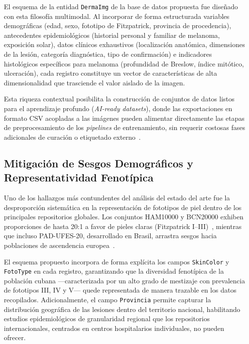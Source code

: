 El esquema de la entidad \texttt{DermaImg} de la base de datos propuesta fue diseñado con esta filosofía multimodal. Al incorporar de forma estructurada variables demográficas (edad, sexo, fototipo de Fitzpatrick, provincia de procedencia), antecedentes epidemiológicos (historial personal y familiar de melanoma, exposición solar), datos clínicos exhaustivos (localización anatómica, dimensiones de la lesión, categoría diagnóstica, tipo de confirmación) e indicadores histológicos específicos para melanoma (profundidad de Breslow, índice mitótico, ulceración), cada registro constituye un vector de características de alta dimensionalidad que trasciende el valor aislado de la imagen.

Esta riqueza contextual posibilita la construcción de conjuntos de datos listos para el aprendizaje profundo (\textit{AI-ready datasets}), donde las exportaciones en formato CSV acopladas a las imágenes pueden alimentar directamente las etapas de preprocesamiento de los \textit{pipelines} de entrenamiento, sin requerir costosas fases adicionales de curación o etiquetado externo~\cite{datavlab_annotation,medrxiv_preannotation}.

\subsection{Mitigación de Sesgos Demográficos y Representatividad Fenotípica}

Uno de los hallazgos más contundentes del análisis del estado del arte fue la desproporción sistemática en la representación de fototipos de piel dentro de los principales repositorios globales. Los conjuntos HAM10000 y BCN20000 exhiben proporciones de hasta 20:1 a favor de pieles claras (Fitzpatrick I--III)~\cite{iccs_bias_derm,pmc_ham10000,arxiv_bcn20000}, mientras que incluso PAD-UFES-20, desarrollado en Brasil, arrastra sesgos hacia poblaciones de ascendencia europea~\cite{pmc_padufes}.

El esquema propuesto incorpora de forma explícita los campos \texttt{SkinColor} y \texttt{FotoType} en cada registro, garantizando que la diversidad fenotípica de la población cubana ---caracterizada por un alto grado de mestizaje con prevalencia de fototipos III, IV y V--- quede representada de manera trazable en los datos recopilados. Adicionalmente, el campo \texttt{Provincia} permite capturar la distribución geográfica de las lesiones dentro del territorio nacional, habilitando estudios epidemiológicos de granularidad regional que los repositorios internacionales, centrados en centros hospitalarios individuales, no pueden ofrecer.

